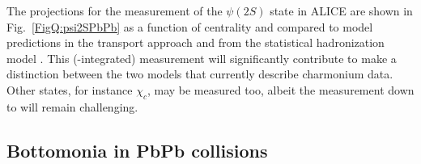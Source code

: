\documentclass[../report.tex]{subfiles}
\providecommand{\main}{..}
\begin{document}
The projections for the measurement of the $\psi(2S)$ state in ALICE are shown in Fig.~\ref{FigQ:psi2SPbPb} as a function of centrality and compared to model predictions in the transport approach \cite{Du:2015wha}  and from the statistical hadronization model \cite{Andronic:2017pug}. This (\pT-integrated) measurement will significantly contribute to make a distinction between the two models that currently describe charmonium data.
Other states, for instance $\chi_c$, may be measured too, albeit the measurement down to  will remain challenging.




\subsection{Bottomonia in PbPb collisions}%

\end{document}
